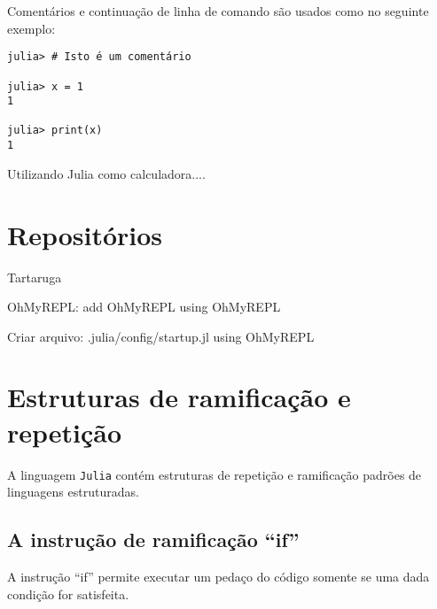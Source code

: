 Comentários e continuação de linha de comando são usados como no seguinte exemplo:

\begin{lstlisting}
julia> # Isto é um comentário

julia> x = 1
1

julia> print(x)
1
\end{lstlisting}





Utilizando Julia como calculadora....




































\section{Repositórios}

Tartaruga 

OhMyREPL:
add OhMyREPL
using OhMyREPL

Criar arquivo:
.julia/config/startup.jl
using OhMyREPL





\section{Estruturas de ramificação e repetição}

A linguagem \verb+Julia+ contém estruturas de repetição e ramificação padrões de linguagens estruturadas.

\subsection{A instrução de ramificação ``if''}

A instrução ``if'' permite executar um pedaço do código somente se uma dada condição for satisfeita.

